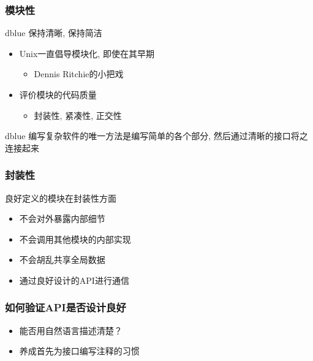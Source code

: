 \documentclass[compress]{beamer}
\newenvironment{pblock}{\begin{beamercolorbox}[rounded=true,
        shadow=true]{dblue}}{\end{beamercolorbox}}
\begin{document}
\begin{frame}
\frametitle{模块性}

\begin{pblock}
    保持清晰, 保持简洁
\end{pblock}

\begin{itemize}
\item Unix一直倡导模块化, 即使在其早期
    \begin{itemize}
    \item Dennis Ritchie的小把戏
    \end{itemize}

\item 评价模块的代码质量
\begin{itemize}
\item 封装性, 紧凑性, 正交性 
\end{itemize}
\end{itemize}

\begin{pblock}
    编写复杂软件的唯一方法是编写简单的各个部分, 然后通过清晰的接口将之连接起来
\end{pblock}

\end{frame}

\begin{frame}
\frametitle{封装性}
\begin{block} {良好定义的模块在封装性方面}
\begin{itemize}
  \item 不会对外暴露内部细节
  \item 不会调用其他模块的内部实现
  \item 不会胡乱共享全局数据
  \item 通过良好设计的API进行通信
\end{itemize}
\end{block}
\end{frame}

\begin{frame}
\frametitle{如何验证API是否设计良好}
\begin{itemize}
  \item 能否用自然语言描述清楚？
	\item 养成首先为接口编写注释的习惯
\end{itemize}
\end{frame}
\end{document}
